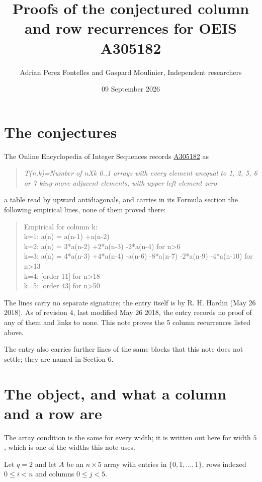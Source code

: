 \documentclass[11pt]{article}
\title{Proofs of the conjectured column and row recurrences for OEIS A305182}
\author{Adrian Perez Fontelles and Gaspard Moulinier, Independent researchers}
\date{09 September 2026}
\theoremstyle{definition}
\begin{document}
\maketitle
\section{The conjectures}

The Online Encyclopedia of Integer Sequences records \href{https://oeis.org/A305182}{A305182} as

\begin{quote}\itshape T(n,k)=Number of nXk 0..1 arrays with every element unequal to 1, 2, 5, 6 or 7 king-move adjacent elements, with upper left element zero\end{quote}

a table read by upward antidiagonals, and carries in its Formula section the following empirical lines, none of them proved there:

\begin{quote}\ttfamily Empirical for column k:\\
k=1: a(n) = a(n-1) +a(n-2)\\k=2: a(n) = 3*a(n-2) +2*a(n-3) -2*a(n-4) for n>6\\k=3: a(n) = 4*a(n-3) +4*a(n-4) -a(n-6) -8*a(n-7) -2*a(n-9) -4*a(n-10) for n>13\\k=4: [order 11] for n>18\\k=5: [order 43] for n>50\end{quote}

The lines carry no separate signature; the entry itself is by R. H. Hardin (May 26 2018). As of revision 4, last modified May 26 2018, the entry records no proof of any of them and links to none. This note proves the 5 column recurrences listed above.

The entry also carries further lines of the same blocks that this note does not settle; they are named in Section 6.

\section{The object, and what a column and a row are}

The array condition is the same for every width; it is written out here for width $5$, which is one of the widths this note uses.

Let $q = 2$ and let $A$ be an $n \times 5$ array with entries in $\{0,1,\dots,1\}$, rows indexed $0 \le i < n$ and columns $0 \le j < 5$.
\end{document}
